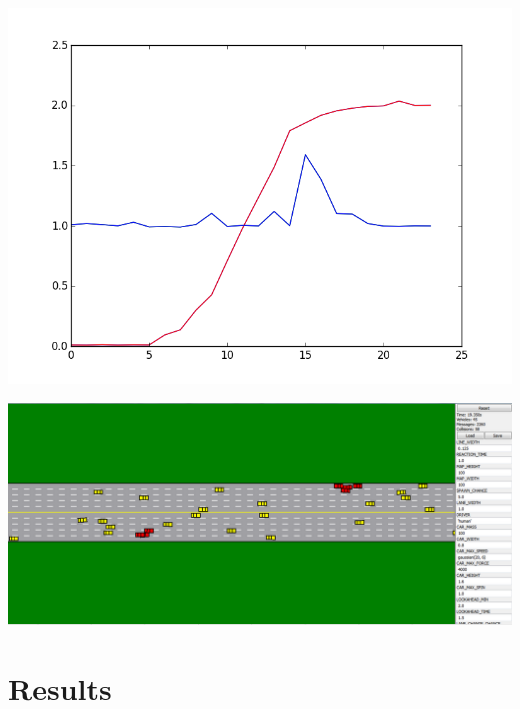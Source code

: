 \documentclass[a0,landscape]{a0poster}
\begin{document}
\begin{multicols}{3}
\centerline{\includegraphics{rand_plot}}

\includegraphics[width=1\linewidth]{car_sim}



\section*{Results}


\end{multicols}
\end{document}
